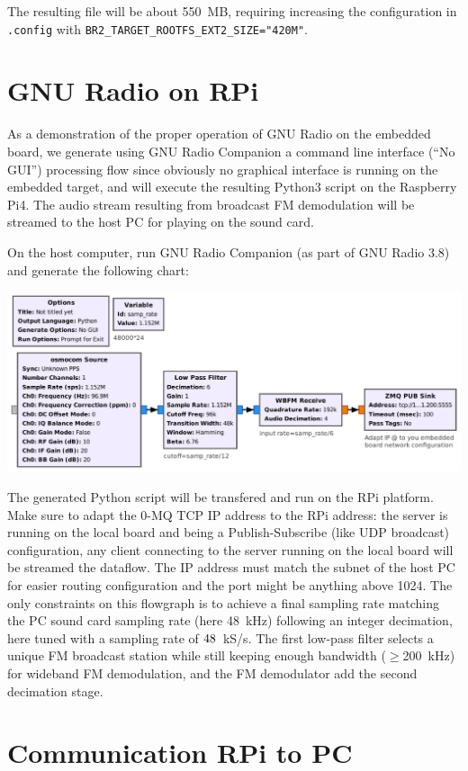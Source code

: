 \documentclass[a4paper]{article}
\begin{document}
The resulting file will be about 550~MB, requiring increasing the configuration in {\tt .config}
with {\tt BR2\_TARGET\_ROOTFS\_EXT2\_SIZE="420M"}.

\section{GNU Radio on RPi}

As a demonstration of the proper operation of GNU Radio on the embedded board, we
generate using GNU Radio Companion a command line interface (``No GUI'') processing flow 
since obviously no graphical interface is running on the embedded target, and will execute 
the resulting Python3 script on the Raspberry Pi4. The audio stream resulting from broadcast
FM demodulation will be streamed to the host PC for playing on the sound card.

On the host computer, run GNU Radio Companion (as part of GNU Radio 3.8) and generate
the following chart:

\includegraphics[width=\linewidth]{target}

The generated Python script will be transfered and run on the RPi platform. Make sure
to adapt the 0-MQ TCP IP address to the RPi address: the server is running on the local board
and being a Publish-Subscribe (like UDP broadcast) configuration, any client connecting to
the server running on the local board will be streamed the dataflow. The IP address must
match the subnet of the host PC for easier routing configuration and the port might be
anything above 1024. The only constraints on this flowgraph is to achieve a final sampling
rate matching the PC sound card sampling rate (here 48~kHz) following an integer decimation,
here tuned with a sampling rate of $48\time 24$~kS/s. The first low-pass filter selects
a unique FM broadcast station while still keeping enough bandwidth ($\geq$200~kHz) for
wideband FM demodulation, and the FM demodulator add the second decimation stage.

\section{Communication RPi to PC}
\end{document}
